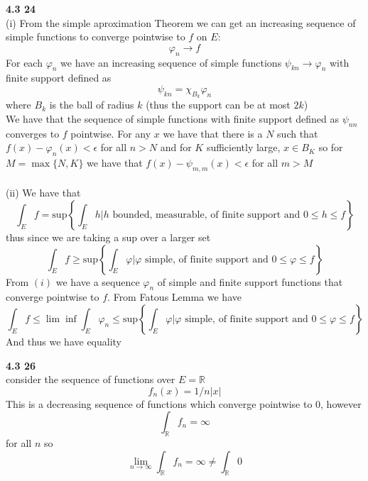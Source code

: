 \documentclass[12pt]{article}
\newenvironment{ques}[1]{\textbf{#1}\vspace{1 mm}\\ }{\bigskip}
\theoremstyle{definition}
\renewcommand{\l}{\left }
\renewcommand{\r}{\right }
\newcommand{\R}{\mathbb R}
\renewcommand{\sup}{\text{sup}}
\renewcommand{\-}{\backslash}
\begin{document}
\begin{ques}{4.3 24}
	(i) From the simple aproximation Theorem we can get an increasing sequence of
	simple functions to converge pointwise to $f$ on $E$: 
	$$\varphi_n \to f$$
	For each $\varphi_n$ we have an increasing sequence of simple functions
	$\psi_{kn} \to \varphi_n$
	with finite support defined as
	$$\psi_{kn} = \chi_{B_k}\varphi_n$$
	where $B_k$ is the ball of radius $k$ (thus the support can be at most $2k$)\\
	We have that the sequence of simple functions with finite support defined
	as $\psi_{nn}$ converges to $f$ pointwise. For any $x$ we have that there
	is a $N$ such that $f(x) - \varphi_n(x) < \epsilon$ for all $n > N$ and for
	$K$ sufficiently large, $x \in B_K$ so for $M = \max\{N,K\}$ we have that
	$f(x) - \psi_{m,m}(x) < \epsilon$ for all $m > M$\\
	\\
	(ii) We have that 
	$$\int_E f = \sup\l\{\int_E h | h \text{ bounded, measurable, of finite
	support and } 0 \leq h \leq f\r\}$$
	thus since we are taking a sup over a larger set
	$$\int_E f \geq \sup\l\{\int_E \varphi | \varphi \text{ simple, of finite
	support and } 0 \leq \varphi \leq f\r\}$$
	From $(i)$ we have a sequence $\varphi_n$ of simple and finite support
	functions that converge pointwise to $f$. From Fatous Lemma we have
	$$\int_E f \leq \lim \inf \int_E \varphi_n \leq \sup\l\{\int_E \varphi |
	\varphi \text{ simple, of finite support and } 0 \leq \varphi \leq f\r\}$$
	And thus we have equality
\end{ques}

\begin{ques}{4.3 26}
	consider the sequence of functions over $E = \R$
	$$f_n(x) = 1/n|x|$$
	This is a decreasing sequence of functions which converge pointwise to $0$, however
	$$\int_\R f_n = \infty$$
	for all $n$ so 
	$$\lim_{n \to \infty} \int_\R f_n = \infty \neq \int_\R 0$$
\end{ques}
\end{document}

